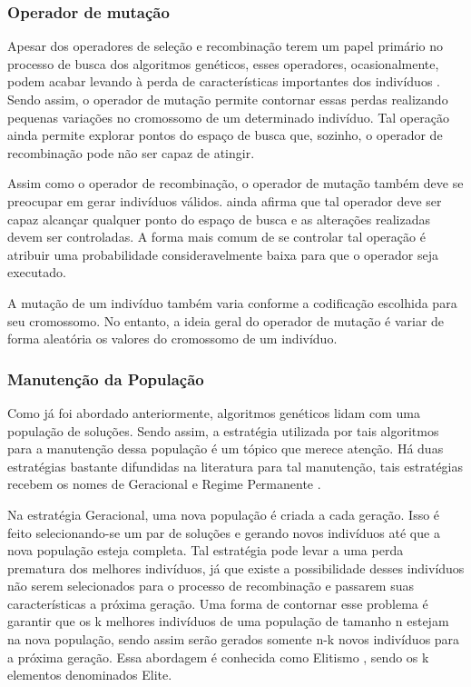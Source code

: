 \subsubsection{Operador de mutação}

Apesar dos operadores de seleção e recombinação terem um papel primário no processo de busca dos algoritmos genéticos, esses operadores, ocasionalmente, podem acabar levando à perda de características importantes dos indivíduos \cite{Goldberg1989}. Sendo assim, o operador de mutação permite contornar essas perdas realizando pequenas variações no cromossomo de um determinado indivíduo. Tal operação ainda permite explorar pontos do espaço de busca que, sozinho, o operador de recombinação pode não ser capaz de atingir.

Assim como o operador de recombinação, o operador de mutação também deve se preocupar em gerar indivíduos válidos. \cite{Talbi2009} ainda afirma que tal operador deve ser capaz alcançar qualquer ponto do espaço de busca e as alterações realizadas devem ser controladas. A forma mais comum de se controlar tal operação é atribuir uma probabilidade consideravelmente baixa para que o operador seja executado.

A mutação de um indivíduo também varia conforme a codificação escolhida para seu cromossomo. No entanto, a ideia geral do operador de mutação é variar de forma aleatória os valores do cromossomo de um indivíduo. 

\subsubsection{Manutenção da População}

Como já foi abordado anteriormente, algoritmos genéticos lidam com uma população de soluções. Sendo assim, a estratégia utilizada por tais algoritmos para a manutenção dessa população é um tópico que merece atenção. Há duas estratégias bastante difundidas na literatura para tal manutenção, tais estratégias recebem os nomes de Geracional e Regime Permanente \cite{Kacprzyk2015}.

Na estratégia Geracional, uma nova população é criada a cada geração. Isso é feito selecionando-se um par de soluções e gerando novos indivíduos até que a nova população esteja completa. Tal estratégia pode levar a uma perda prematura dos melhores indivíduos, já que existe a possibilidade desses indivíduos não serem selecionados para o processo de recombinação e passarem suas características a próxima geração. Uma forma de contornar esse problema é garantir que os k melhores indivíduos de uma população de tamanho n estejam na nova população, sendo assim serão gerados somente n-k novos indivíduos para a próxima geração. Essa abordagem é conhecida como Elitismo \cite{Talbi2009}, sendo os k elementos denominados Elite.

